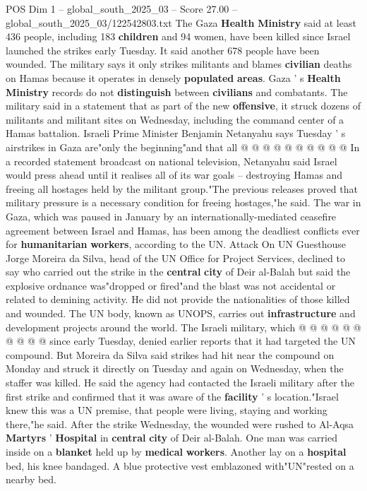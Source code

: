 \begin{textsample}{POS Dim 1 – global\_south\_2025\_03 – Score 27.00 – global\_south\_2025\_03/122542803.txt}
The Gaza \textbf{Health} \textbf{Ministry} said at least 436 people, including 183 \textbf{children} and 94 women, have been killed since Israel launched the strikes early Tuesday.
It said another 678 people have been wounded.
The military says it only strikes militants and blames \textbf{civilian} deaths on Hamas because it operates in densely \textbf{populated} \textbf{areas}.
Gaza ' s \textbf{Health} \textbf{Ministry} records do not \textbf{distinguish} between \textbf{civilians} and combatants.
The military said in a statement that as part of the new \textbf{offensive}, it struck dozens of militants and militant sites on Wednesday, including the command center of a Hamas battalion.
Israeli Prime Minister Benjamin Netanyahu says Tuesday ' s airstrikes in Gaza are"only the beginning"and that all @ @ @ @ @ @ @ @ @ @ In a recorded statement broadcast on national television, Netanyahu said Israel would press ahead until it realises all of its war goals -- destroying Hamas and freeing all hostages held by the militant group."The previous releases proved that military pressure is a necessary condition for freeing hostages,"he said.
The war in Gaza, which was paused in January by an internationally-mediated ceasefire agreement between Israel and Hamas, has been among the deadliest conflicts ever for \textbf{humanitarian} \textbf{workers}, according to the UN.
Attack On UN Guesthouse Jorge Moreira da Silva, head of the UN Office for Project Services, declined to say who carried out the strike in the \textbf{central} \textbf{city} of Deir al-Balah but said the explosive ordnance was"dropped or fired"and the blast was not accidental or related to demining activity.
He did not provide the nationalities of those killed and wounded.
The UN body, known as UNOPS, carries out \textbf{infrastructure} and development projects around the world.
The Israeli military, which @ @ @ @ @ @ @ @ @ @ since early Tuesday, denied earlier reports that it had targeted the UN compound.
But Moreira da Silva said strikes had hit near the compound on Monday and struck it directly on Tuesday and again on Wednesday, when the staffer was killed.
He said the agency had contacted the Israeli military after the first strike and confirmed that it was aware of the \textbf{facility} ' s location."Israel knew this was a UN premise, that people were living, staying and working there,"he said.
After the strike Wednesday, the wounded were rushed to Al-Aqsa \textbf{Martyrs} ' \textbf{Hospital} in \textbf{central} \textbf{city} of Deir al-Balah.
One man was carried inside on a \textbf{blanket} held up by \textbf{medical} \textbf{workers}.
Another lay on a \textbf{hospital} bed, his knee bandaged.
A blue protective vest emblazoned with"UN"rested on a nearby bed.

\end{textsample}
